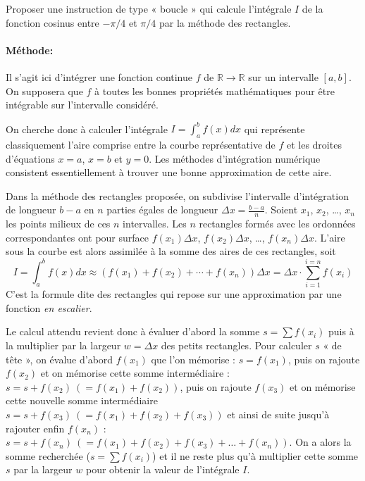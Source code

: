 \documentclass[11pt,a4paper,colorlinks,breaklinks]{article}
\begin{document}
\begin{framed}
\noindent
Proposer une instruction de type « boucle » qui calcule l'intégrale $I$ de la 
fonction cosinus entre $-\pi/4$ et $\pi/4$ par la méthode des rectangles.
\end{framed}

\paragraph{Méthode:} 
Il s'agit ici d'intégrer une fonction continue $f$ de $\mathbb{R} \rightarrow \mathbb{R}$ 
sur un intervalle $[a,b]$.
On supposera que $f$ à toutes les bonnes propriétés mathématiques pour être
intégrable sur l'intervalle considéré. 

On cherche donc à calculer l'intégrale
$\displaystyle I = \int_a^b f(x)dx$ qui représente classiquement l'aire
comprise entre la courbe représentative de $f$ et les droites d'équations 
$x=a$, $x=b$ et $y=0$. Les méthodes d'intégration numérique consistent 
essentiellement à trouver une bonne approximation de cette aire.

Dans la méthode des rectangles proposée, on subdivise l'intervalle d'intégration de
longueur $b-a$ en $n$ parties égales de longueur $\displaystyle\Delta x = \frac{b-a}{n}$. 
Soient $x_1$, $x_2$, \ldots, $x_n$ les points milieux de ces $n$ intervalles. 
Les $n$ rectangles formés avec les ordonnées correspondantes ont pour surface 
$f(x_1)\Delta x$, $f(x_2)\Delta x$, \ldots, $f(x_n)\Delta x$. 
L'aire sous la courbe est alors assimilée à la somme des aires de ces rectangles, soit 
$$\displaystyle I = \int_a^b f(x)dx \approx \left(f(x_1)+f(x_2)+\cdots+f(x_n)\right)\Delta x = 
\Delta x\cdot\sum_{i=1}^{i=n}f(x_i)$$ 
C'est la formule dite des rectangles qui repose sur une approximation par une fonction 
{\em en	escalier}.

Le calcul attendu revient donc à évaluer d'abord la somme $s = \sum f(x_i)$ puis
à la multiplier par la largeur $w = \Delta x$ des petits rectangles. 
Pour calculer $s$ « de tête »,
on évalue d'abord $f(x_1)$ que l'on mémorise : $s = f(x_1)$, 
puis on rajoute $f(x_2)$ et on mémorise cette somme intermédiaire : 
$s = s + f(x_2) \ (= f(x_1) + f(x_2))$, 
puis on rajoute $f(x_3)$ et on mémorise cette nouvelle somme intermédiaire  
$s = s + f(x_3) \ (= f(x_1) + f(x_2) + f(x_3))$
et ainsi de suite jusqu'à rajouter enfin $f(x_n)$ : 
$s = s + f(x_n) \ (= f(x_1) + f(x_2) + f(x_3) + \ldots + f(x_n))$. 
On a alors la somme recherchée ($s = \sum f(x_i)$) et
il ne reste plus qu'à multiplier cette somme $s$ par la largeur $w$ pour obtenir la valeur de l'intégrale $I$.
\end{document}
